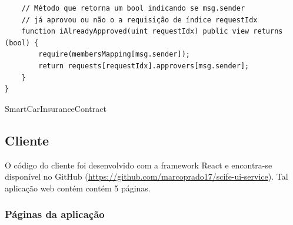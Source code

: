 \begin{code}
\begin{verbatim}
    // Método que retorna um bool indicando se msg.sender
    // já aprovou ou não o a requisição de índice requestIdx
    function iAlreadyApproved(uint requestIdx) public view returns (bool) {
        require(membersMapping[msg.sender]);
        return requests[requestIdx].approvers[msg.sender];
    }
}
\end{verbatim}
\caption{SmartCarInsuranceContract}
\label{lst:SmartCarInsuranceContract}
\end{code}

\subsection{Cliente}

O código do cliente foi desenvolvido com a framework React e encontra-se disponível no GitHub (\href{https://github.com/marcoprado17/scife-ui-service}{https://github.com/marcoprado17/scife-ui-service}). Tal aplicação web contém contém 5 páginas.

\subsubsection{Páginas da aplicação}

